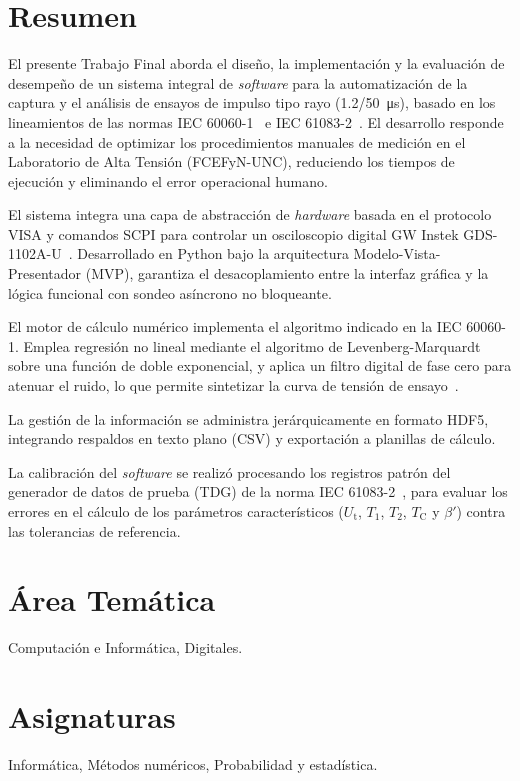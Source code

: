 \newpage
\section*{Resumen}
\label{sec:resumen}
El presente Trabajo Final aborda el diseño, la implementación y la evaluación de desempeño de un sistema integral de \emph{software} para la automatización de la captura y el análisis de ensayos de impulso tipo rayo (\qty[parse-numbers=false]{1.2/50}{\micro\second}), basado en los lineamientos de las normas IEC 60060-1~\cite{iec60060_1} e IEC 61083-2~\cite{iec61083_2}. El desarrollo responde a la necesidad de optimizar los procedimientos manuales de medición en el Laboratorio de Alta Tensión (FCEFyN-UNC), reduciendo los tiempos de ejecución y eliminando el error operacional humano.

El sistema integra una capa de abstracción de \emph{hardware} basada en el protocolo VISA y comandos SCPI para controlar un osciloscopio digital GW Instek GDS-1102A-U~\cite{gds1000au_ProgrammingManual}. Desarrollado en Python bajo la arquitectura Modelo-Vista-Presentador (MVP), garantiza el desacoplamiento entre la interfaz gráfica y la lógica funcional con sondeo asíncrono no bloqueante.

El motor de cálculo numérico implementa el algoritmo indicado en la IEC 60060-1. Emplea regresión no lineal mediante el algoritmo de Levenberg-Marquardt sobre una función de doble exponencial, y aplica un filtro digital de fase cero para atenuar el ruido, lo que permite sintetizar la curva de tensión de ensayo~\cite{iec60060_1}. 

La gestión de la información se administra jerárquicamente en formato HDF5, integrando respaldos en texto plano (CSV) y exportación a planillas de cálculo.

La calibración del \emph{software} se realizó procesando los registros patrón del generador de datos de prueba (TDG) de la norma IEC 61083-2~\cite{iec61083_2}, para evaluar los errores en el cálculo de los parámetros característicos ($U_\text{t}$, $T_1$, $T_2$, $T_\text{C}$ y $\beta'$) contra las tolerancias de referencia.

\section*{Área Temática}
Computación e Informática, Digitales.

\section*{Asignaturas}
Informática, Métodos numéricos, Probabilidad y estadística.

